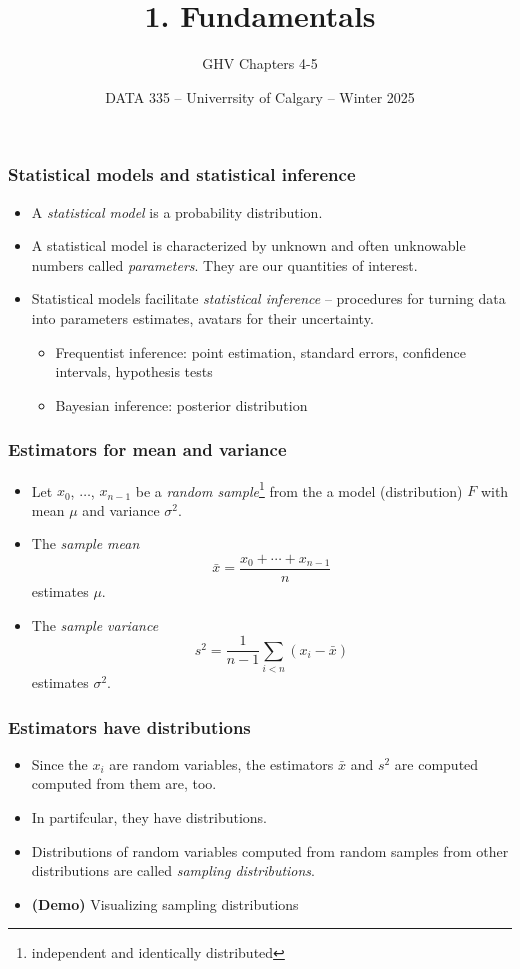 \documentclass{beamer}
\title{1. Fundamentals}
\subtitle{GHV Chapters 4-5}
\institute{}
\date{DATA 335 -- Univerrsity of Calgary -- Winter 2025}
\begin{document}
\frame{\titlepage}

\begin{frame}
\frametitle{Statistical models and statistical inference}


\begin{itemize}
    \item A \emph{statistical model} is a probability distribution.
    \item A statistical model is characterized by unknown and often unknowable numbers called \emph{parameters}.
    They are our quantities of interest.
    \item Statistical models facilitate \emph{statistical inference} --
    procedures for turning data into parameters estimates,
    avatars for their uncertainty.
    \begin{itemize}
        \item Frequentist inference: point estimation, standard errors, confidence intervals, hypothesis tests
        \item Bayesian inference: posterior distribution
    \end{itemize}
\end{itemize}
\end{frame}

\begin{frame}
\frametitle{Estimators for mean and variance}
\begin{itemize}
\item Let $x_0$, $\ldots$, $x_{n - 1}$ be a
\emph{random sample}\footnote{independent and identically distributed}
from the a model (distribution) $F$ with mean $\mu$ and variance $\sigma^2$.

\item The \emph{sample mean}
$$
\bar{x} = \frac{x_0+\cdots+x_{n-1}}n
$$
estimates $\mu$.

\item The \emph{sample variance}
$$
s^2 = \frac1{n - 1}\sum_{i < n}(x_i - \bar{x})
$$
estimates $\sigma^2$.
\end{itemize}
\end{frame}

\begin{frame}
\frametitle{Estimators have distributions}

\begin{itemize}
    \item Since the $x_i$ are random variables, the estimators $\bar{x}$ and $s^2$ are computed computed from them are, too.
    \item In partifcular, they have distributions.
    \item Distributions of random variables computed from random samples from other distributions are called \emph{sampling distributions}.
    \item \textbf{(Demo)} Visualizing sampling distributions
\end{itemize}
\end{frame}
\end{document}
